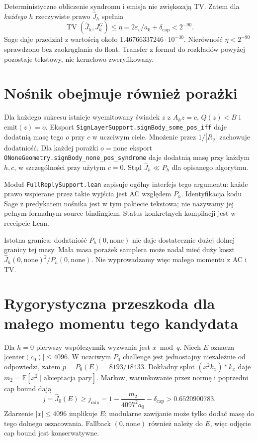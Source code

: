 \documentclass[11pt,a4paper]{article}
\newcommand{\code}[1]{\nolinkurl{#1}}
\newcommand{\TV}{\operatorname{TV}}
\newcommand{\E}{\mathbb E}
\begin{document}
Deterministyczne obliczenie syndromu i emisja nie zwiększają TV. Zatem
dla \emph{każdego} $h$ rzeczywiste prawo $\widehat J_h$ spełnia
\[
 \TV(\widehat J_h,J^G_h)\le
 \eta=2\varepsilon_v/a_0+\delta_{\mathrm{cap}}<2^{-90}.
\]
Sage daje przedział z wartością około $1.46766337246\cdot10^{-30}$.
Nierówność $\eta<2^{-90}$ sprawdzono bez zaokrąglania do float.
Transfer z formuł do rozkładów powyżej pozostaje tekstowy,
nie kernelowo zweryfikowany.

\section{Nośnik obejmuje również porażki}
Dla każdego sukcesu istnieje wyemitowany świadek $z$ z $A_hz=c$, $Q(z)<B$
i $\mathrm{emit}(z)=o$. Eksport
\code{SignLayerSupport.signBody_some_pos_iff} daje dodatnią masę tego
$o$ przy $c$ w uczciwym ciele. Mnożenie przez $1/|R_q|$ zachowuje dodatniość.
Dla każdej porażki $o=\mathrm{none}$ eksport
\code{ONoneGeometry.signBody_none_pos_syndrome} daje dodatnią masę
przy każdym $h,c$, w szczególności przy użytym $c=0$.
Stąd $\widehat J_h\ll P_h$ dla opisanego algorytmu.

Moduł \code{FullReplySupport.lean} zapisuje ogólny interfejs tego argumentu:
każde prawo wspierane przez takie wyjścia jest AC względem $P_h$.
Identyfikacja kodu Sage z predykatem nośnika jest w tym pakiecie tekstowa;
nie nazywamy jej pełnym formalnym source bindingiem.
Status konkretnych kompilacji jest w receipcie Lean.

Istotna granica: dodatniość $P_h(0,\mathrm{none})$ nie daje dostatecznie
dużej dolnej granicy tej masy. Mała masa porażek samplera może nadal
mieć duży koszt $\widehat J_h(0,\mathrm{none})^2/P_h(0,\mathrm{none})$.
Nie wyprowadzamy więc małego momentu z AC i TV.

\section{Rygorystyczna przeszkoda dla małego momentu tego kandydata}
Dla $h=0$ pierwszy współczynnik wyzwania jest $x\bmod q$.
Niech $E$ oznacza $|\mathrm{center}(c_0)|\le4096$.
W uczciwym $P_0$ challenge jest jednostajny niezależnie od odpowiedzi,
zatem $p=P_0(E)=8193/18433$.
Dokładny splot $(x^2k_x)\ast k_x$ daje $m_2=\E[x^2\mid\text{akceptacja pary}]$.
Markow, warunkowanie przez normę i poprzedni cap bound dają
\[
 j=\widehat J_0(E)\ge
 j_{\min}=1-\frac{m_2}{4097^2a_0}-\delta_{\mathrm{cap}}
 >0.6520900783.
\]
Zdarzenie $|x|\le4096$ implikuje $E$; modularne zawijanie może tylko
dodać masę do tego dolnego oszacowania. Fallback $(0,\mathrm{none})$
również należy do $E$, więc odjęcie cap bound jest konserwatywne.
\end{document}
